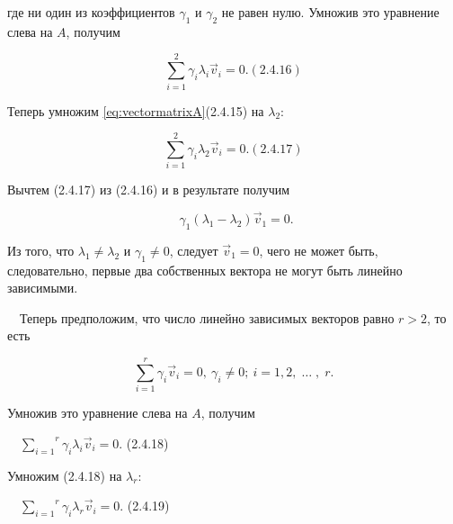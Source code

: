 		где ни один из коэффициентов  $\gamma_1$ и  $\gamma_2$ не равен нулю. Умножив это уравнение слева на  $A$, получим



\begin{equation}\label{key}
	\overset 2{\underset{i=1}{\sum }}\gamma_i\lambda _i\vec v_i=0.  (2.4.16)
\end{equation}



		Теперь умножим \eqref{eq:vectormatrixA}(2.4.15) на  $\lambda _2$:



	\begin{equation}\label{key}
		\overset 2{\underset{i=1}{\sum }}\gamma_i\lambda _2\vec v_i=0.  (2.4.17)
	\end{equation}



		Вычтем (2.4.17) из (2.4.16) и в результате получим



\begin{equation*}\label{key}
		\ \  \gamma_1(\lambda _1-\lambda _2)\vec v_1=0.
\end{equation*}



		Из того, что  $\lambda _1\neq \lambda _2$ и  $\gamma_1\neq 0$, следует  $\vec v_1=0$, чего не может быть, следовательно, первые два
		собственных вектора не могут быть линейно зависимыми.



		\ \ Теперь предположим, что число линейно зависимых векторов равно  $r>2$, то есть



\begin{equation*}\label{key}
		\ \  \overset r{\underset{i=1}{\sum }}\gamma_i\vec v_i=0,\ \gamma_i\neq 0;\ i=1,2,\;\ldots \;,\;r.\ \ 
\end{equation*}



		Умножив это уравнение слева на  $A$, получим



		\ \  $\overset r{\underset{i=1}{\sum }}\gamma_i\lambda _i\vec v_i=0$.  (2.4.18)



		Умножим (2.4.18) на  $\lambda _r$:



		\ \  $\overset r{\underset{i=1}{\sum }}\gamma_i\lambda _r\vec v_i=0$.  (2.4.19)



